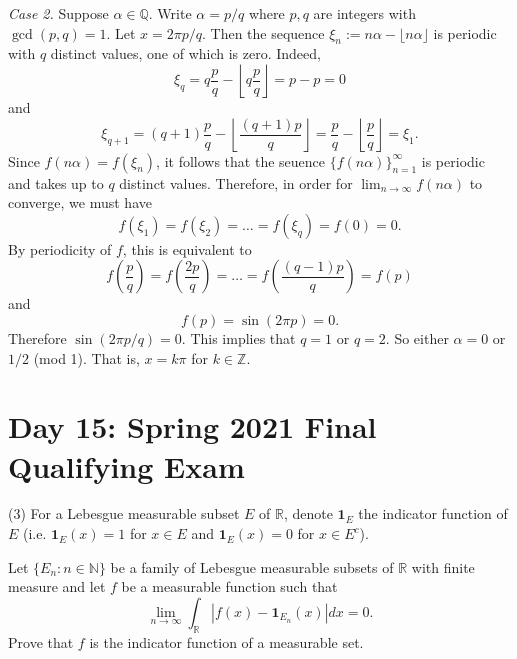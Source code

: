 \documentclass[answers]{exam}
\theoremstyle{problemstyle}
\newcommand{\1}[1]{\textbf{1}_{\left[#1\right]}} %
\def\limn{\lim_{n\to\infty}} %
\def\R{\mathbb{R}} %
\def\Z{\mathbb{Z}} %
\def\Q{\mathbb{Q}} %
\def\({\left (}
\def\){\right )}
\begin{document}
\begin{questions}
\begin{solution}
  \textit{Case 2.} Suppose $\alpha\in\Q$. Write $\alpha = p/q$ where $p,q$ are integers with $\gcd(p,q)=1$. Let $x = 2\pi p/q$. Then the sequence $\xi_{n}:= n\alpha-\lfloor n \alpha \rfloor$ is periodic with $q$ distinct values, one of which is zero. Indeed,
  \begin{equation*}
    \xi_{q}=q \frac{p}{q} - \left\lfloor q \frac{p}{q} \right\rfloor = p-p = 0
  \end{equation*}
  and
  \begin{equation*}
    \xi_{q+1}= (q+1)\frac{p}{q} - \left\lfloor \frac{(q+1)p}{q} \right\rfloor = \frac{p}{q} - \left\lfloor \frac{p}{q}\right\rfloor = \xi_{1}.
  \end{equation*}
  Since $f(n\alpha) = f(\xi_{n})$, it follows that the seuence $\{f(n\alpha)\}_{n=1}^{\infty}$ is periodic and takes up to $q$ distinct values. Therefore, in order for $\limn f(n\alpha)$ to converge, we must have
  \[ f(\xi_{1})=f(\xi_{2})=\ldots=f(\xi_{q})=f(0)=0. \]
  By periodicity of $f$, this is equivalent to
	\begin{equation*}
    f\(\frac{p}{q}\)= f\(\frac{2p}{q}\)=\ldots=f\left(\frac{(q-1)p}{q}\right)=f(p)
  \end{equation*}
  and
  \begin{equation*}
    f(p) = \sin(2\pi p)=0.
  \end{equation*}
  Therefore $\sin(2\pi p/q)=0$. This implies that $q=1$ or $q=2$. So either $\alpha =0$ or $1/2$ (mod 1). That is, $x=k\pi$ for $k\in \Z$.
\end{solution}


\newpage
\section{Day 15: Spring 2021 Final Qualifying Exam}

\question (3) For a Lebesgue measurable subset $E$ of $\R$, denote $\textbf{1}_E$ the indicator function of $E$ (i.e. $\textbf{1}_E(x)=1$ for $x\in E$ and $\textbf{1}_E(x) = 0$ for $x\in E^c$).

Let $\{E_n: n\in \mathbb{N}\}$ be a family of Lebesgue measurable subsets of $\R$ with finite measure and let $f$ be a measurable function such that \begin{equation*}
\limn \int_{\R} | f(x)-\textbf{1}_{E_n}(x)| dx = 0.
\end{equation*}
Prove that $f$ is the indicator function of a measurable set.


\end{questions}
\end{document}
